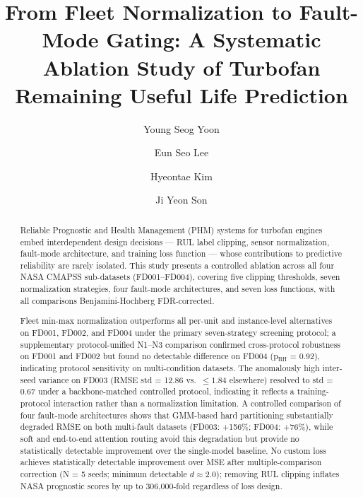 \documentclass[review,12pt]{elsarticle}
\begin{document}
\begin{frontmatter}

\title{From Fleet Normalization to Fault-Mode Gating: A Systematic Ablation Study of Turbofan Remaining Useful Life Prediction}

\author[inst1]{Young Seog Yoon}

\author[inst1]{Eun Seo Lee}

\author[inst1]{Hyeontae Kim}

\author[inst2]{Ji Yeon Son}



\begin{abstract}
Reliable Prognostic and Health Management (PHM) systems for turbofan engines embed interdependent design decisions — RUL label clipping, sensor normalization, fault-mode architecture, and training loss function — whose contributions to predictive reliability are rarely isolated. This study presents a controlled ablation across all four NASA CMAPSS sub-datasets (FD001–FD004), covering five clipping thresholds, seven normalization strategies, four fault-mode architectures, and seven loss functions, with all comparisons Benjamini-Hochberg FDR-corrected.

Fleet min-max normalization outperforms all per-unit and instance-level alternatives on FD001, FD002, and FD004 under the primary seven-strategy screening protocol; a supplementary protocol-unified N1--N3 comparison confirmed cross-protocol robustness on FD001 and FD002 but found no detectable difference on FD004 (p$_\text{BH}$ = 0.92), indicating protocol sensitivity on multi-condition datasets. The anomalously high inter-seed variance on FD003 (RMSE std = 12.86 vs.\ $\leq\!1.84$ elsewhere) resolved to std = 0.67 under a backbone-matched controlled protocol, indicating it reflects a training-protocol interaction rather than a normalization limitation. A controlled comparison of four fault-mode architectures shows that GMM-based hard partitioning substantially degraded RMSE on both multi-fault datasets (FD003: +156\%; FD004: +76\%), while soft and end-to-end attention routing avoid this degradation but provide no statistically detectable improvement over the single-model baseline. No custom loss achieves statistically detectable improvement over MSE after multiple-comparison correction (N = 5 seeds; minimum detectable $d \approx 2.0$); removing RUL clipping inflates NASA prognostic scores by up to 306,000-fold regardless of loss design.


\end{abstract}
\end{frontmatter}
\end{document}
